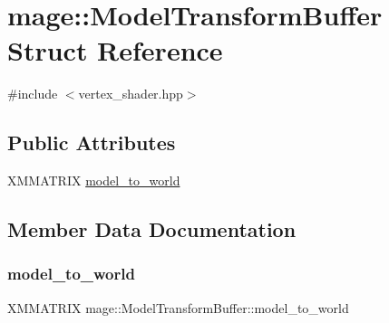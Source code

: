 \hypertarget{structmage_1_1_model_transform_buffer}{}\section{mage\+:\+:Model\+Transform\+Buffer Struct Reference}
\label{structmage_1_1_model_transform_buffer}


{\ttfamily \#include $<$vertex\+\_\+shader.\+hpp$>$}

\subsection*{Public Attributes}
\begin{DoxyCompactItemize}
\item 
X\+M\+M\+A\+T\+R\+IX \hyperlink{structmage_1_1_model_transform_buffer_af77a272e4c05ef6ad4504220e9a43df7}{model\+\_\+to\+\_\+world}
\end{DoxyCompactItemize}


\subsection{Member Data Documentation}
\hypertarget{structmage_1_1_model_transform_buffer_af77a272e4c05ef6ad4504220e9a43df7}{}\label{structmage_1_1_model_transform_buffer_af77a272e4c05ef6ad4504220e9a43df7} 
\subsubsection{\texorpdfstring{model\+\_\+to\+\_\+world}{model\_to\_world}}
{\footnotesize\ttfamily X\+M\+M\+A\+T\+R\+IX mage\+::\+Model\+Transform\+Buffer\+::model\+\_\+to\+\_\+world}

